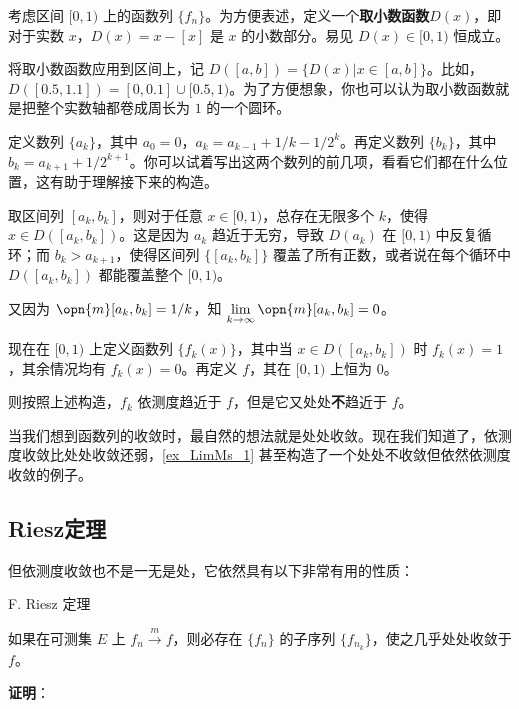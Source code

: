\begin{example}{}\label{ex_LimMs_1}

考虑区间 $[0, 1)$ 上的函数列 $\{f_n\}$。为方便表述，定义一个\textbf{取小数函数}$D(x)$，即对于实数 $x$，$D(x)=x-[x]$ 是 $x$ 的小数部分。易见 $D(x)\in [0, 1)$ 恒成立。

将取小数函数应用到区间上，记 $D([a, b])=\{D(x)|x\in[a, b]\}$。比如，$D([0.5, 1.1])=[0, 0.1]\cup[0.5, 1)$。为了方便想象，你也可以认为取小数函数就是把整个实数轴都卷成周长为 $1$ 的一个圆环。

定义数列 $\{a_k\}$，其中 $a_0=0$，$a_k=a_{k-1}+1/k-1/2^k$。再定义数列 $\{b_k\}$，其中 $b_k=a_{k+1}+1/2^{k+1}$。你可以试着写出这两个数列的前几项，看看它们都在什么位置，这有助于理解接下来的构造。

取区间列 $[a_k, b_k]$，则对于任意 $x\in[0, 1)$，总存在无限多个 $k$，使得 $x\in D([a_k, b_k])$。这是因为 $a_k$ 趋近于无穷，导致 $D(a_k)$ 在 $[0, 1)$ 中反复循环；而 $b_k>a_{k+1}$，使得区间列 $\{[a_k, b_k]\}$ 覆盖了所有正数，或者说在每个循环中 $D([a_k, b_k])$ 都能覆盖整个 $[0, 1)$。

又因为 $\opn{m}[a_k, b_k]=1/k$，知 $\lim\limits_{k\to \infty}\opn{m}[a_k, b_k]=0$。

现在在 $[0, 1)$ 上定义函数列 $\{f_k(x)\}$，其中当 $x\in D([a_k, b_k])$ 时 $f_k(x)=1$，其余情况均有 $f_k(x)=0$。再定义 $f$，其在 $[0, 1)$ 上恒为 $0$。

则按照上述构造，$f_k$ 依测度趋近于 $f$，但是它又处处\textbf{不}趋近于 $f$。

\end{example}

当我们想到函数列的收敛时，最自然的想法就是处处收敛。现在我们知道了，依测度收敛比处处收敛还弱，\autoref{ex_LimMs_1} 甚至构造了一个处处不收敛但依然依测度收敛的例子。


\subsection{Riesz定理}



但依测度收敛也不是一无是处，它依然具有以下非常有用的性质：

\begin{theorem}{F. Riesz 定理}

如果在可测集 $E$ 上 $f_n\overset{m}\to f$，则必存在 $\{f_n\}$ 的子序列 $\{f_{n_k}\}$，使之几乎处处收敛于 $f$。

\end{theorem}

\textbf{证明}：

